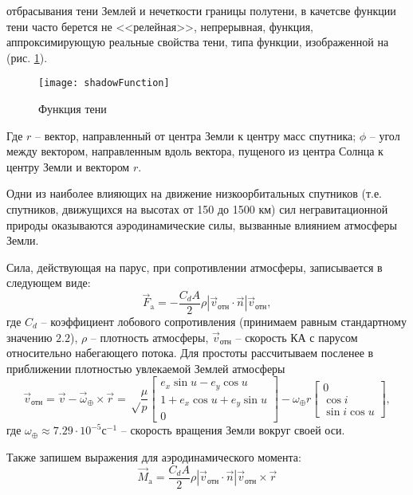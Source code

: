 отбрасывания тени Землей и нечеткости границы полутени, в качетсве функции тени
часто берется не <<релейная>>, непрерывная, функция, аппроксимирующую реальные
свойства тени, типа функции, изображенной на (рис. \ref{fig:shadowFunction}).
\begin{figure}[h!]
  \centering
  \texttt{[image: shadowFunction]}
  \caption{Функция тени}
  \label{fig:shadowFunction}
\end{figure}
Где $r$ -- вектор, направленный от центра Земли к центру масс спутника; $\phi$
-- угол между вектором, направленным вдоль вектора, пущеного из центра Солнца к
центру Земли и вектором $r$.\par
    Одни из наиболее влияющих на движение низкоорбитальных спутников (т.е. спутников,
движущихся на высотах от 150 до 1500 км) сил негравитационной природы оказываются
аэродинамические силы, вызванные влиянием атмосферы Земли.\par
    Сила, действующая на парус, при сопротивлении атмосферы, записывается в
следующем виде:
\begin{equation}
    \vec{F}_{\text{a}} = -\frac{C_d A}{2}\rho|\vec{v}_{\text{отн}} \cdot \vec{n}| \vec{v}_{\text{отн}},
\end{equation}
где $C_d$ -- коэффициент лобового сопротивления (принимаем равным стандартному
значению $2.2$), $\rho$ -- плотность атмосферы, $\vec{v}_{\text{отн}}$ --
скорость КА с парусом относительно набегающего потока. Для простоты рассчитываем
посленее в приближении плотностью увлекаемой Землей атмосферы
\begin{equation}
    \vec{v}_{\text{отн}} = \vec{v} - \vec{\omega}_{\oplus} \times \vec{r} =
\sqrt\frac{\mu}{p}\begin{bmatrix}
           e_x\sin u - e_y\cos u \\
           1 + e_x\cos u + e_y\sin u \\
           0
         \end{bmatrix} - \omega_{\oplus}r\begin{bmatrix}
                    0 \\
                    \cos i \\
                    \sin i \cos u
                  \end{bmatrix},
\end{equation}
где $\omega_{\oplus} \approx 7.29\cdot 10^{-5} \text{с}^{-1}$ -- скорость вращения
Земли вокруг своей оси.\par
    Также запишем выражения для аэродинамического момента:
\begin{equation}
    \vec{M}_{\text{a}} = \frac{C_d A}{2}\rho|\vec{v}_{\text{отн}} \cdot \vec{n}| \vec{v}_{\text{отн}}\times\vec{r}
\end{equation}
